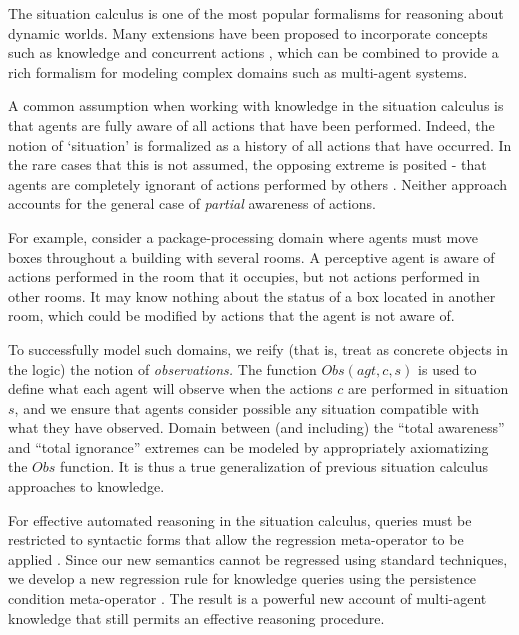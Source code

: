 \documentclass{ifaamas-submission}
\begin{document}
The situation calculus \cite{pirri99contributions_sitcalc} is one
of the most popular formalisms for reasoning about dynamic worlds.
Many extensions have been proposed to incorporate concepts such as
knowledge \cite{scherl03sc_knowledge} and concurrent actions \cite{reiter96sc_nat_conc},
which can be combined to provide a rich formalism for modeling complex
domains such as multi-agent systems.

A common assumption when working with knowledge in the situation calculus
is that agents are fully aware of all actions that have been performed.
Indeed, the notion of `situation' is formalized as a history of all
actions that have occurred. In the rare cases that this is not assumed,
the opposing extreme is posited - that agents are completely ignorant
of actions performed by others \cite{Lesperance99sitcalc_approach}.
Neither approach accounts for the general case of \emph{partial} awareness
of actions. 

For example, consider a package-processing domain where agents must
move boxes throughout a building with several rooms. A perceptive
agent is aware of actions performed in the room that it occupies,
but not actions performed in other rooms. It may know nothing about the
status of a box located in another room, which could be modified by actions
that the agent is not aware of. 

To successfully model such domains, we reify (that is, treat as concrete
objects in the logic) the notion of \emph{observations.} The function
$Obs(agt,c,s)$ is used to define what each agent will observe
when the actions $c$ are performed in situation $s$, and we ensure
that agents consider possible any situation compatible with what they
have observed.  Domain between (and including) the {}``total awareness'' and
{}``total ignorance'' extremes can 
be modeled by appropriately axiomatizing the $Obs$ function.
It is thus a true generalization
of previous situation calculus approaches to knowledge.

For effective automated reasoning in the situation calculus, queries
must be restricted to syntactic forms that allow the regression meta-operator
to be applied \cite{pirri99contributions_sitcalc}. Since our new
semantics cannot be regressed using standard techniques, we develop a
new regression
rule for knowledge queries using the persistence condition meta-operator
\cite{kelly07sc_persistence}. The result is a powerful new account
of multi-agent knowledge that still permits an effective reasoning
procedure.
\end{document}

